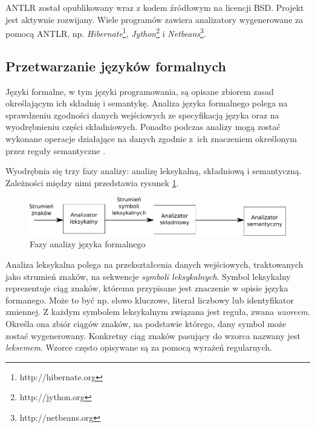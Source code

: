 ANTLR został opublikowany wraz z kodem źródłowym na licencji BSD. 
Projekt jest
aktywnie rozwijany. Wiele programów zawiera analizatory wygenerowane za pomocą
ANTLR, np. \emph{Hibernate}\footnote{http://hibernate.org}, \emph{Jython}\footnote{http://jython.org}
i \emph{Netbeans}\footnote{http://netbeans.org}.

\subsection{Przetwarzanie języków formalnych}
Języki formalne, w tym języki programowania, są opisane zbiorem zasad określającym
ich składnię i semantykę. Analiza języka formalnego polega na sprawdzeniu zgodności
danych wejściowych ze specyfikacją języka oraz na wyodrębnieniu części składniowych.
Ponadto podczas analizy mogą zostać wykonane operacje działające na danych zgodnie
z~ich znaczeniem określonym przez reguły semantyczne \cite{compilers}.

Wyodrębnia się trzy fazy analizy: analizę leksykalną, składniową i semantyczną. 
Zależności między nimi przedstawia rysunek \ref{antlr_phases}. 


\begin{figure}[h]
  \centering
    \includegraphics[width=\textwidth]{img/antlr_phases.pdf}
    \caption{Fazy analizy języka formalnego}
    \label{antlr_phases}
\end{figure}


Analiza leksykalna polega na przekształcenia danych wejściowych, traktowanych jako 
strumień znaków, na sekwencje \emph{symboli leksykalnych}. Symbol leksykalny reprezentuje
ciąg znaków, któremu przypisane jest znaczenie w opisie języka formanego. Może to 
być np. słowo kluczowe, literał liczbowy lub identyfikator zmiennej.
Z każdym symbolem leksykalnym związana jest reguła, zwana \emph{wzorcem}. Określa ona
zbiór ciągów znaków, na podstawie którego, dany symbol może zostać wygenerowany.
Konkretny ciąg znaków pasujący do wzorca nazwany jest \emph{leksemem}.
Wzorce często opisywane są za pomocą wyrażeń regularnych.

